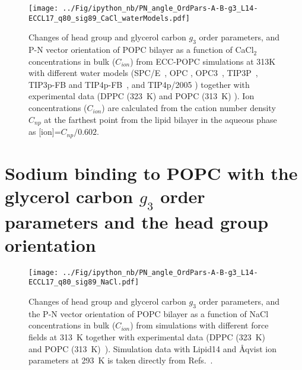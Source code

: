 \documentclass[journal=jpcbfk]{achemso}
\begin{document}
\begin{figure}[!hp]
  \centering
  \texttt{[image: ../Fig/ipython\_nb/PN\_angle\_OrdPars-A-B-g3\_L14-ECCL17\_q80\_sig89\_CaCl\_waterModels.pdf]}
  \caption{\label{fig:ordPars_waterModels}
    Changes of head group and glycerol carbon $g_3$ order parameters, and P-N vector orientation of POPC bilayer
    as a function of CaCl$_2$ concentrations in bulk ($C_{ion}$) from ECC-POPC simulations at 313K with different
    water models (SPC/E~\cite{Berendsen1987}, OPC \cite{Izadi14}, OPC3~\cite{Izadi16}, TIP3P~\cite{jorgensen83}, TIP3p-FB and TIP4p-FB~\cite{Wang2014}, and TIP4p/2005 \cite{Abascal2005})
    together with experimental data (DPPC (323~K) \cite{akutsu81} and POPC (313~K) \cite{altenbach84}). 
    Ion concentrations ($C_{ion}$) are calculated from the cation number density $C_{np}$
    at the farthest point from the lipid bilayer in the aqueous phase as [ion]=$C_{np}/0.602$.
  }
\end{figure}


\newpage
\section{Sodium binding to POPC with the glycerol carbon $g_3$ order parameters and the head group orientation}

\begin{figure}[!h]
  \centering
  \texttt{[image: ../Fig/ipython\_nb/PN\_angle\_OrdPars-A-B-g3\_L14-ECCL17\_q80\_sig89\_NaCl.pdf]}
  \caption{\label{fig:delta_ordPar_NaCl_si}
    Changes of head group and glycerol carbon $g_3$ order parameters, and the P-N vector orientation of POPC bilayer
    as a function of NaCl concentrations in bulk ($C_{ion}$)
    from simulations with different force fields at 313~K together with experimental
    data (DPPC (323~K)~\cite{akutsu81} and POPC (313~K)~\cite{altenbach84}). 
    Simulation data with Lipid14 and \AA{}qvist ion parameters at 293~K is taken directly
    from Refs.~.
  }
\end{figure}
\end{document}
